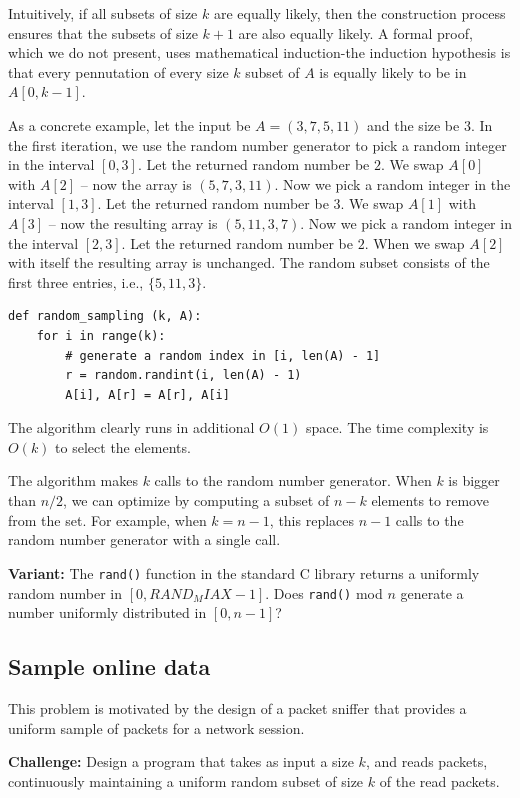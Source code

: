 \documentclass[11pt,a4paper]{article}
\begin{document}
Intuitively, if all subsets of size $k$ are equally likely, then the
construction process ensures that the subsets of size $k + 1$ are also equally
likely. A formal proof, which we do not present, uses mathematical
induction-the induction hypothesis is that every pennutation of every size $k$
subset of $A$ is equally likely to be in $A[0, k - 1]$.

As a concrete example, let the input be $A = (3,7,5,11)$ and the size be $3$.
In the first iteration, we use the random number generator to pick a random
integer in the interval $[0,3]$. Let the returned random number be $2$. We
swap $A[0]$ with $A[2]$ -- now the array is $(5,7,3,11)$. Now we pick a random
integer in the interval $[1,3]$. Let the returned random number be $3$. We
swap $A[1]$ with $A[3]$ -- now the resulting array is $(5,11,3,7)$. Now we
pick a random integer in the interval $[2,3]$. Let the returned random number
be $2$. When we swap $A[2]$ with itself the resulting array is unchanged. The
random subset consists of the first three entries, i.e., $\{5,11,3\}$.

\begin{verbatim}
def random_sampling (k, A): 
    for i in range(k):
        # generate a random index in [i, len(A) - 1] 
        r = random.randint(i, len(A) - 1)
        A[i], A[r] = A[r], A[i]
\end{verbatim}

The algorithm clearly runs in additional $O(1)$ space. The time complexity is
$O(k)$ to select the elements.

The algorithm makes $k$ calls to the random number generator. When $k$ is
bigger than $n/2$, we can optimize by computing a subset of $n - k$ elements
to remove from the set. For example, when $k=n-1$, this replaces $n-1$ calls
to the random number generator with a single call.

\textbf{Variant:} The \texttt{rand()} function in the standard C library
returns a uniformly random number in $[0, RAND_MIAX - 1]$. Does
\texttt{rand()} mod $n$ generate a number uniformly distributed in $[0, n -
1]$?

\subsection{Sample online data}

This problem is motivated by the design of a packet sniffer that provides a
uniform sample of packets for a network session.

\textbf{Challenge:} Design a program that takes as input a size $k$, and reads
packets, continuously maintaining a uniform random subset of size $k$ of the
read packets.
\end{document}
